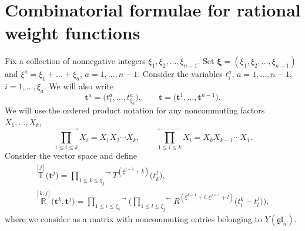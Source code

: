 \documentclass[pdftex]{sigma}
\numberwithin{equation}{section}
\begin{document}
\section{Combinatorial formulae for rational weight functions}

Fix a collection of nonnegative integers $\xi_1,\xi_2,\dots,\xi_{n-1}$. Set $\boldsymbol{\xi}=(\xi_1,\xi_2,\dots,\xi_{n-1})$ and $\xi^a=\xi_1+\dots+\xi_a$, $a=1,\dots,n-1$.
Consider the variables $t^a_i$, $a=1,\dots, n-1$, $i=1,\dots, \xi_a$. We will also write
\begin{equation*}
\boldsymbol{t}^a=\bigl(t^a_1,\dots, t^a_{\xi_a}\bigr),\qquad \boldsymbol{t}=\bigl(\boldsymbol{t}^1,\dots,\boldsymbol{t}^{n-1}\bigr).
\end{equation*}
We will use the ordered product notation for any noncommuting factors $X_1,\dots,X_k$,
\begin{equation*}
\overset{\rightarrow}{\prod\limits_{1\leq i\leq k}} X_i= X_1X_2\cdots X_k, \qquad \overset{\leftarrow}{\prod\limits_{1\leq i\leq k}} X_i= X_kX_{k-1}\cdots X_1.
\end{equation*}
Consider the vector space  and define
\begin{gather*}
\overset{[j]}{\mathbb{T}}\bigl({\boldsymbol{t}^j}\bigr)=\overset{\rightarrow}{\prod\limits_{ 1\leq k\leq \xi_j}} {T}^{(\xi^{j-1}+k)}\bigl(t_k^j\bigr),\\ \overset{[k,j]}{\mathbb{R}}\bigl(\boldsymbol{t}^k,\boldsymbol{t}^j\bigr)=
\overset{\rightarrow}{\prod\limits_{1\leq i\leq\xi_k}}\Biggl(
\overset{\leftarrow}{\prod\limits_{1\leq l\leq\xi_j}} {R}^{(\xi^{k-1}+i,\xi^{j-1}+l)}\bigl(t^k_i-t^j_l\bigr)\Biggr),
\end{gather*}
where we consider  as a matrix with noncommuting entries belonging to $Y(\mathfrak{gl}_{n})$.
\end{document}
